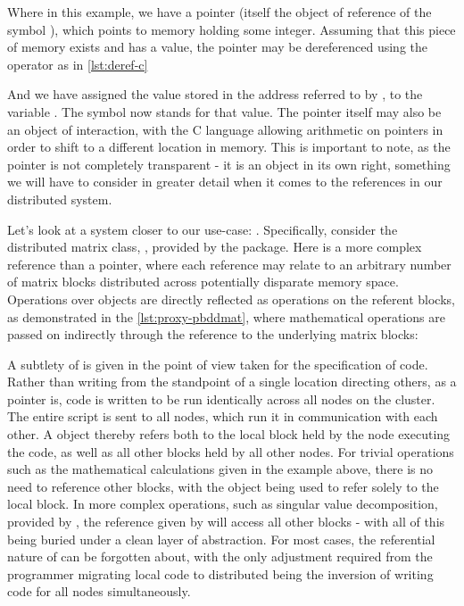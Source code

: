 
Where in this example, we have a pointer (itself the object of reference
of the symbol ), which points to memory holding some integer.
Assuming that this piece of memory exists and has a value, the pointer
may be dereferenced using the  operator as in \cref{lst:deref-c}


And we have assigned the value stored in the address referred to by
, to the variable . The symbol  now stands
for that value. The pointer itself may also be an object of interaction,
with the C language allowing arithmetic on pointers in order to shift to
a different location in memory. This is important to note, as the
pointer is not completely transparent - it is an object in its own
right, something we will have to consider in greater detail when it
comes to the references in our distributed system.

Let's look at a system closer to our use-case: . Specifically,
consider the distributed matrix class, , provided by
the  package. Here is a more complex reference than a pointer,
where each  reference may relate to an arbitrary number
of matrix blocks distributed across potentially disparate memory space.
Operations over  objects are directly reflected as
operations on the referent blocks, as demonstrated in the \cref{lst:proxy-pbddmat},
where mathematical operations are passed on indirectly through
the  reference to the underlying matrix blocks:


A subtlety of  is given in the point of view taken for the
specification of code. Rather than writing from the standpoint of a
single location directing others, as a pointer is,  code is written
to be run identically across all nodes on the cluster. The entire script
is sent to all nodes, which run it in communication with each other. A
 object thereby refers both to the local block held by
the node executing the code, as well as all other blocks held by all
other nodes. For trivial operations such as the mathematical
calculations given in the example above, there is no need to reference
other blocks, with the  object being used to refer
solely to the local block. In more complex operations, such as singular
value decomposition, provided by , the reference given by
 will access all other blocks - with all of this being
buried under a clean layer of abstraction. For most cases, the
referential nature of  can be forgotten about, with the
only adjustment required from the programmer migrating local code to
distributed being the inversion of writing code for all nodes
simultaneously.

